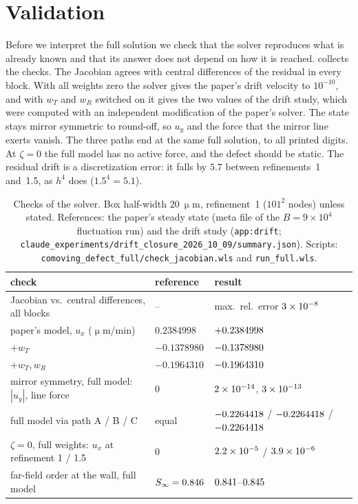\documentclass[11pt,a4paper]{article}
\newcommand{\micron}{\upmu\mathrm{m}}
\newcommand{\minute}{\mathrm{min}}
\begin{document}
\section{Validation}
\label{sec:validation}

Before we interpret the full solution we check that the solver reproduces what is already
known and that its answer does not depend on how it is reached. 
collects the checks. The Jacobian agrees with central differences of the residual in every
block. With all weights zero the solver gives the paper's drift velocity to $10^{-10}$, and
with $w_T$ and $w_R$ switched on it gives the two values of the drift study, which were computed
with an independent modification of the paper's solver. The state stays mirror symmetric to
round-off, so $u_y$ and the force that the mirror line exerts vanish. The three paths end at the same
full solution, to all printed digits. At $\zeta=0$ the full model has no active
force, and the defect should be static. The residual drift is a discretization error: it
falls by $5.7$ between refinements~1 and~1.5, as $h^4$ does ($1.5^4=5.1$).

\begin{table}[t]
  \centering
  \caption{Checks of the solver. Box half-width $20~\micron$, refinement~1 ($101^2$
    nodes) unless stated. References: the paper's steady state (meta file of the
    $B=9\times10^4$ fluctuation run) and the drift study (\texttt{app:drift};
    \texttt{claude\_experiments/drift\_closure\_2026\_10\_09/summary.json}).
    Scripts: \texttt{comoving\_defect\_full/check\_jacobian.wls} and
    \texttt{run\_full.wls}.}
  \label{tab:validation}
  \small
  \begin{tabular}{lll}
    \toprule
    check & reference & result\\
    \midrule
    Jacobian vs.\ central differences, all blocks & -- & max.\ rel.\ error $3\times10^{-8}$\\
    paper's model, $u_x$ ($\micron/\minute$) & $0.2384998$ & $+0.2384998$\\
    $+w_T$ & $-0.1378980$ & $-0.1378980$\\
    $+w_T,w_R$ & $-0.1964310$ & $-0.1964310$\\
    mirror symmetry, full model: $|u_y|$, line force & 0 & $2\times10^{-14}$, $3\times10^{-13}$\\
    full model via path A / B / C & equal & $-0.2264418$ / $-0.2264418$ / $-0.2264418$\\
    $\zeta=0$, full weights: $u_x$ at refinement 1 / 1.5 & 0 &
      $2.2\times10^{-5}$ / $3.9\times10^{-6}$\\
    far-field order at the wall, full model & $S_\infty=0.846$ & $0.841$--$0.845$\\
    \bottomrule
  \end{tabular}
\end{table}
\end{document}
